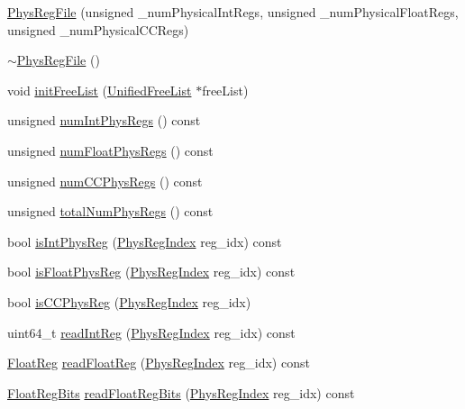 \begin{DoxyCompactItemize}
\item 
\hyperlink{classPhysRegFile_acbcbe09a90b7a6c7c8f65e741567e6e6}{PhysRegFile} (unsigned \_\-numPhysicalIntRegs, unsigned \_\-numPhysicalFloatRegs, unsigned \_\-numPhysicalCCRegs)
\item 
\hyperlink{classPhysRegFile_a0575415d268018e7c2b476a953efd066}{$\sim$PhysRegFile} ()
\item 
void \hyperlink{classPhysRegFile_acbe3de868fb982a4e1cdcc18b7b70306}{initFreeList} (\hyperlink{classUnifiedFreeList}{UnifiedFreeList} $\ast$freeList)
\item 
unsigned \hyperlink{classPhysRegFile_a6ace1a0a3bffbaf6d36944decd89392f}{numIntPhysRegs} () const 
\item 
unsigned \hyperlink{classPhysRegFile_acd9085a0b607fef8ea9d26f933b66b90}{numFloatPhysRegs} () const 
\item 
unsigned \hyperlink{classPhysRegFile_ac201fa880ee34a4d30c73c7f0adedcef}{numCCPhysRegs} () const 
\item 
unsigned \hyperlink{classPhysRegFile_ad16381c6ff3ee42d5456b1d632a52730}{totalNumPhysRegs} () const 
\item 
bool \hyperlink{classPhysRegFile_a4484974c71716e3a2e14b8e5207a5002}{isIntPhysReg} (\hyperlink{o3_2comm_8hh_a5ec29599c4bc29a3054c451674969e7b}{PhysRegIndex} reg\_\-idx) const 
\item 
bool \hyperlink{classPhysRegFile_ad4633a6224fc5694bdf2d9558d20501f}{isFloatPhysReg} (\hyperlink{o3_2comm_8hh_a5ec29599c4bc29a3054c451674969e7b}{PhysRegIndex} reg\_\-idx) const 
\item 
bool \hyperlink{classPhysRegFile_a781ae6a1156bf528a33e2489664c1dd4}{isCCPhysReg} (\hyperlink{o3_2comm_8hh_a5ec29599c4bc29a3054c451674969e7b}{PhysRegIndex} reg\_\-idx)
\item 
uint64\_\-t \hyperlink{classPhysRegFile_a5eb773a9b4b73e9e51ba3b155cf881f7}{readIntReg} (\hyperlink{o3_2comm_8hh_a5ec29599c4bc29a3054c451674969e7b}{PhysRegIndex} reg\_\-idx) const 
\item 
\hyperlink{classPhysRegFile_a75484259f1855aabc8d74c6eb1cfe186}{FloatReg} \hyperlink{classPhysRegFile_a43267ea98fb72ca0b1aa7dedc37cc571}{readFloatReg} (\hyperlink{o3_2comm_8hh_a5ec29599c4bc29a3054c451674969e7b}{PhysRegIndex} reg\_\-idx) const 
\item 
\hyperlink{classPhysRegFile_aab5eeae86499f9bfe15ef79360eccc64}{FloatRegBits} \hyperlink{classPhysRegFile_a8fd79275783cdb4121866e3aee43c839}{readFloatRegBits} (\hyperlink{o3_2comm_8hh_a5ec29599c4bc29a3054c451674969e7b}{PhysRegIndex} reg\_\-idx) const 

\end{DoxyCompactItemize}
